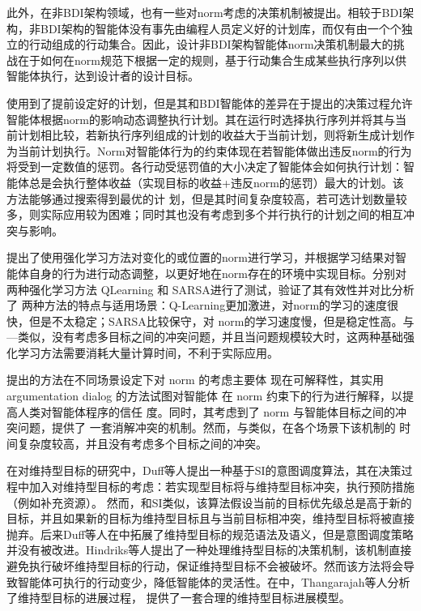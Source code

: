 此外，在非BDI架构领域，也有一些对norm考虑的决策机制被提出。相较于BDI架构，非BDI架构的智能体没有事先由编程人员定义好的计划库，而仅有由一个个独立的行动组成的行动集合。因此，设计非BDI架构智能体norm决策机制最大的挑战在于如何在norm规范下根据一定的规则，基于行动集合生成某些执行序列以供智能体执行，达到设计者的设计目标。

%
\cite{DBLP:conf/atal/ShamsVPV15}使用到了提前设定好的计划，但是其和BDI智能体的差异在于\cite{DBLP:conf/atal/ShamsVPV15}提出的决策过程允许智能体根据norm的影响动态调整执行计划。其在运行时选择执行序列并将其与当前计划相比较，若新执行序列组成的计划的收益大于当前计划，则将新生成计划作为当前计划执行。Norm对智能体行为的约束体现在若智能体做出违反norm的行为将受到一定数值的惩罚。各行动受惩罚值的大小决定了智能体会如何执行计划：智能体总是会执行整体收益（实现目标的收益+违反norm的惩罚）最大的计划。该方法能够通过搜索得到最优的计 划，但是其时间复杂度较高，若可选计划数量较多，则实际应用较为困难；同时其也没有考虑到多个并行执行的计划之间的相互冲突与影响。

\cite{DBLP:conf/atal/LiMFL15}提出了使用强化学习方法对变化的或位置的norm进行学习，并根据学习结果对智能体自身的行为进行动态调整，以更好地在norm存在的环境中实现目标。\cite{DBLP:conf/atal/LiMFL15f}分别对两种强化学习方法 QLearning 和 SARSA\cite{Sutton2005ReinforcementLA}进行了测试，验证了其有效性并对比分析了 两种方法的特点与适用场景：Q-Learning更加激进，对norm的学习的速度很快，但是不太稳定；SARSA比较保守，对 norm的学习速度慢，但是稳定性高。与—类似，\cite{DBLP:conf/atal/LiMFL15}没有考虑多目标之间的冲突问题，并且当问题规模较大时，这两种基础强化学习方法需要消耗大量计算时间，不利于实际应用。

\cite{DBLP:conf/ijcai/ShamsVOP16,DBLP:journals/taas/ShamsVOP20,DBLP:conf/atal/ShamsVPV15}提出的方法在不同场景设定下对 norm 的考虑主要体 现在可解释性，其实用 argumentation dialog 的方法试图对智能体 在 norm 约束下的行为进行解释，以提高人类对智能体程序的信任 度。同时，其考虑到了 norm 与智能体目标之间的冲突问题，提供了 一套消解冲突的机制。然而，与\cite{DBLP:conf/atal/LiMFL15f}类似，在各个场景下该机制的 时间复杂度较高，并且没有考虑多个目标之间的冲突。

在对维持型目标的研究中，Duff等人提出一种基于SI的意图调度算法\cite{DBLP:conf/atal/DuffHT06}，其在决策过程中加入对维持型目标的考虑：若实现型目标将与维持型目标冲突，执行预防措施（例如补充资源）。 然而，和SI类似，该算法假设当前的目标优先级总是高于新的目标，并且如果新的目标为维持型目标且与当前目标相冲突，维持型目标将被直接抛弃。后来Duff等人在\cite{DBLP:journals/ci/DuffTH14}中拓展了维持型目标的规范语法及语义，但是意图调度策略并没有被改进。Hindriks等人提出了一种处理维持型目标的决策机制\cite{DBLP:conf/dalt/HindriksR07}，该机制直接避免执行破坏维持型目标的行动，保证维持型目标不会被破坏。然而该方法将会导致智能体可执行的行动变少，降低智能体的灵活性。在\cite{DBLP:conf/ecai/ThangarajahHMY14}中，Thangarajah等人分析了维持型目标的进展过程， 提供了一套合理的维持型目标进展模型。

